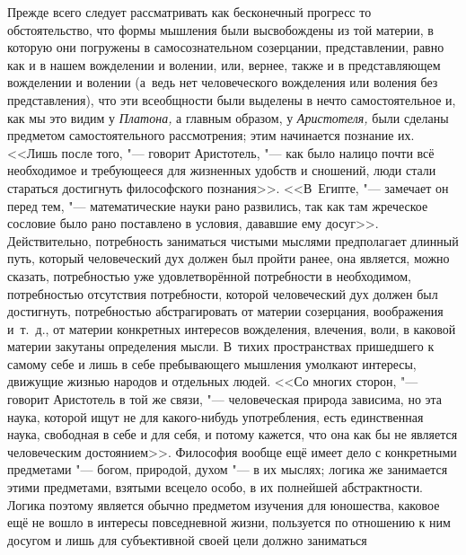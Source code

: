 Прежде всего следует рассматривать как бесконечный прогресс то обстоятельство,
что формы мышления были высвобождены из той материи, в которую они погружены в
самосознательном созерцании, представлении, равно как и в нашем вожделении и
волении, или, вернее, также и в представляющем вожделении и волении (а~ведь нет
человеческого вожделения или воления без представления), что эти всеобщности
были выделены в нечто самостоятельное и, как мы это видим у {\em Платона,} а
главным образом, у {\em Аристотеля,} были сделаны предметом самостоятельного
рассмотрения; этим начинается познание их. <<Лишь после того, "--- говорит
Аристотель, "--- как было налицо почти всё необходимое и требующееся для
жизненных удобств и сношений, люди стали стараться достигнуть философского
познания>>. <<В~Египте,
"--- замечает он перед тем, "--- математические науки рано развились, так как
там жреческое сословие было рано поставлено в условия, дававшие ему
досуг>>.
Действительно, потребность заниматься чистыми мыслями предполагает длинный
путь, который человеческий дух должен был пройти ранее, она является, можно
сказать, потребностью уже удовлетворённой потребности в необходимом,
потребностью отсутствия потребности, которой человеческий дух должен был
достигнуть, потребностью абстрагировать от материи созерцания, воображения
и~т.~д., от материи конкретных интересов вожделения, влечения, воли, в каковой
материи закутаны определения мысли. В~тихих пространствах пришедшего к самому
себе и лишь в себе пребывающего мышления умолкают интересы, движущие жизнью
народов и отдельных людей. <<Со многих сторон, "--- говорит Аристотель в той же
связи, "--- человеческая природа зависима, но эта наука, которой ищут не для
какого-нибудь употребления, есть единственная наука, свободная в себе и для
себя, и потому кажется, что она как бы не является человеческим
достоянием>>. Философия вообще ещё
имеет дело с конкретными предметами "--- богом, природой, духом "--- в их
мыслях; логика же занимается этими предметами, взятыми всецело особо, в их
полнейшей абстрактности. Логика поэтому является обычно предметом изучения для
юношества, каковое ещё не вошло в интересы повседневной жизни, пользуется по
отношению к ним досугом и лишь для субъективной своей цели должно заниматься
